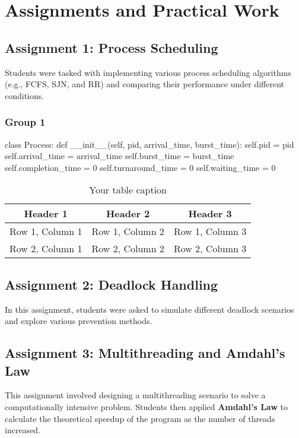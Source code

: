 \documentclass[12pt]{article}
\begin{document}
\section{Assignments and Practical Work}
\subsection{Assignment 1: Process Scheduling}
Students were tasked with implementing various process scheduling algorithms (e.g., FCFS, SJN, and RR) and comparing their performance under different conditions.
\subsubsection{Group 1}
\begin{python}
    class Process:
    def __init__(self, pid, arrival_time, burst_time):
        self.pid = pid
        self.arrival_time = arrival_time
        self.burst_time = burst_time
        self.completion_time = 0
        self.turnaround_time = 0
        self.waiting_time = 0
\end{python}

\begin{table}[htbp] %
    \centering
    \begin{tabular}{|c|c|c|} %
    \hline
    Header 1 & Header 2 & Header 3 \\ %
    \hline
    Row 1, Column 1 & Row 1, Column 2 & Row 1, Column 3 \\ %
    \hline
    Row 2, Column 1 & Row 2, Column 2 & Row 2, Column 3 \\ %
    \hline
    \end{tabular}
    \caption{Your table caption} %
    \label{tab:your_label} %
\end{table}

\subsection{Assignment 2: Deadlock Handling}
In this assignment, students were asked to simulate different deadlock scenarios and explore various prevention methods.

\subsection{Assignment 3: Multithreading and Amdahl's Law}
This assignment involved designing a multithreading scenario to solve a computationally intensive problem. Students then applied \textbf{Amdahl's Law} to calculate the theoretical speedup of the program as the number of threads increased.
\end{document}
